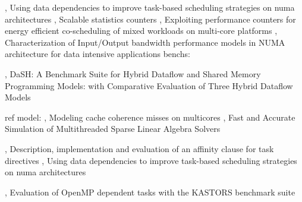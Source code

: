 
%
\cite{Virouleau2016b}, Using data dependencies to improve task-based scheduling strategies on numa architectures
\cite{Dice2013}, Scalable statistics counters
\cite{Libutti2014}, Exploiting performance counters for energy efficient co-scheduling of mixed workloads on multi-core platforms
\cite{Li2013}, Characterization of Input/Output bandwidth performance models in NUMA architecture for data intensive applications
benchs:

\cite{Gajinov2014}, DaSH: A Benchmark Suite for Hybrid Dataflow and Shared Memory Programming Models: with Comparative Evaluation of Three Hybrid Dataflow Models

ref model:
\cite{Pan2014}, Modeling cache coherence misses on multicores
\cite{Stanisic2016}, Fast and Accurate Simulation of Multithreaded Sparse Linear Algebra Solvers



%



\cite{Virouleau2016}, Description, implementation and evaluation of an affinity clause for task directives
\cite{Virouleau2016b}, Using data dependencies to improve task-based scheduling strategies on numa architectures


%
\cite{Virouleau2014}, Evaluation of OpenMP dependent tasks with the KASTORS benchmark suite


%




